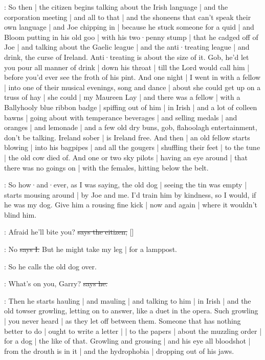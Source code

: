 \Nq:
So then |
the citizen begins talking about the Irish language |
and the corporation meeting
 |
and all to that |
and the shoneens that can't speak their own language |
and Joe chipping in |
because he stuck someone for a quid |
and Bloom putting in his old goo |
with his two·penny stump |
that he cadged off of Joe |
and talking about the Gaelic league |
and the anti·treating league |
and drink,
the curse of Ireland.
Anti·treating is about the size of it.
Gob,
he'd let you pour all manner of drink |
down his throat |
till the Lord would call him |
before you'd ever see the froth of his pint.
And one night |
I went in with a fellow |
into one of their musical evenings,
song and dance |
about she could get up on a truss of hay |
she could |
my Maureen Lay |
and there was a fellow |
with a Ballyhooly blue ribbon badge |
spiffing out of him |
in Irish |
and a lot of colleen bawns |
going about with temperance beverages
 |
and selling medals |
and oranges |
and lemonade |
and a few old dry buns,
gob,
flahoolagh entertainment,
don't be talking.
Ireland sober |
is Ireland free.
And then |
an old fellow starts blowing |
into his bagpipes |
and all the gougers |
shuffling their feet |
to the tune |
the old cow died of.
And one or two sky pilots |
having an eye around |
that there was no goings on |
with the females,
hitting below the belt.

\Nq:
So how·and·ever,
as I was saying,
the old dog |
seeing the tin was empty |
starts mousing around |
by Joe and me.
I'd train him by kindness,
so I would,
if he was my dog.
Give him a rousing fine kick |
now and again |
where it wouldn't blind him.%

\citizen:
Afraid he'll bite you?
\sout{says the citizen,}
[]

:
No
\sout{says I.}
But he might take my leg |
for a lamppost.

\Nq:
So he calls the old dog over.

\citizen:
What's on you,
Garry?
\sout{says he.}

\Nq:
Then he starts hauling |
and mauling |
and talking to him |
in Irish |
and the old towser growling,
letting on to answer,
like a duet in the opera.
Such growling |
you never heard |
as they let off between them.
Someone that has nothing better to do |
ought to write a letter |
 |
to the papers |
about the muzzling order |
for a dog |
the like of that.
Growling and grousing |
and his eye all bloodshot |
from the drouth is in it
 |
and the hydrophobia |
dropping out of his jaws.

